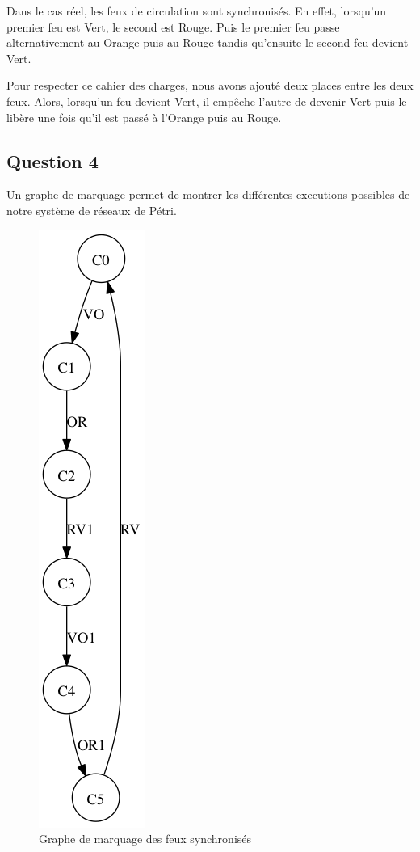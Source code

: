 \documentclass[11pt]{article}
\begin{document}
Dans le cas réel, les feux de circulation sont synchronisés. En effet, lorsqu'un premier feu est Vert, le second est Rouge. Puis le premier feu passe alternativement au Orange puis au Rouge tandis qu'ensuite le second feu devient Vert.

Pour respecter ce cahier des charges, nous avons ajouté deux places entre les deux feux. Alors, lorsqu'un feu devient Vert, il empêche l'autre de devenir Vert puis le libère une fois qu'il est passé à l'Orange puis au Rouge.
 
\subsection{Question 4}

Un graphe de marquage permet de montrer les différentes executions possibles de notre système de réseaux de Pétri.

\begin{figure}[H]
	\centering
	\includegraphics[scale=0.5]{ressources/part1/traitement-question4/graphe.png}
	\caption{Graphe de marquage des feux synchronisés}
\end{figure}
\end{document}
